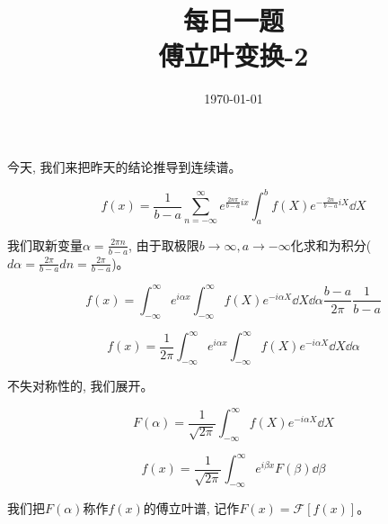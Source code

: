 \documentclass {ctexart}
\title {每日一题\\{\small 傅立叶变换-2}}
\date{\today}
\begin{document}
    \maketitle {}

    今天, 我们来把昨天的结论推导到连续谱。

    \begin{equation}
        f(x) = \frac{1}{b-a} \sum_{n=-\infty}^{\infty} e^{\frac{2n\pi}{b-a} i x} \int_a^b f(X)e^{-\frac{2n}{b-a} i X} \dd X
    \end{equation}

    我们取新变量\(\alpha = \frac{2 \pi n}{b-a}\), 由于取极限\(b \rightarrow \infty,a \rightarrow -\infty\)化求和为积分(\(d\alpha = \frac{2\pi}{b-a}dn = \frac{2\pi}{b-a}\))。

    \begin{equation}
        f(x) = \int_{-\infty}^{\infty} e^{i \alpha x} \int_{-\infty}^{\infty} f(X)e^{-i \alpha X} \dd X \dd \alpha \frac{b-a}{2\pi} \frac{1}{b-a}
    \end{equation}

    \begin{equation}
        f(x) = \frac{1}{2\pi} \int_{-\infty}^{\infty} e^{i \alpha x} \int_{-\infty}^{\infty} f(X)e^{-i \alpha X} \dd X \dd \alpha
    \end{equation}

    不失对称性的, 我们展开。

    \begin{equation}
        F(\alpha) = \frac{1}{\sqrt {2\pi}} \int_{-\infty}^{\infty} f(X)e^{-i \alpha X} \dd X
    \end{equation}

    \begin{equation}
        f(x) = \frac{1}{\sqrt {2\pi}} \int_{-\infty}^{\infty} e^{i \beta x} F(\beta) \dd \beta
    \end{equation}

    我们把\(F(\alpha)\)称作\(f(x)\)的傅立叶谱, 记作\(F(x) = \mathscr{F} [ f(x) ]\)。
\end{document}
